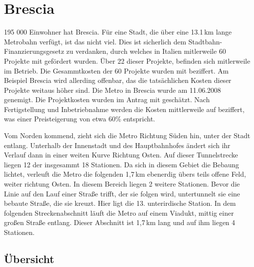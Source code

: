 \section{Brescia} 

195 000 Einwohner hat Brescia. Für eine Stadt, die über eine 13.1\,km lange Metrobahn verfügt, ist das nicht viel. Dies ist sicherlich dem Stadtbahn-Finanzierungsgesetz zu verdanken, durch welches in Italien mitlerweile 60 Projekte mit  gefördert wurden. Über 22 dieser Projekte, befinden sich mitlerweile im Betrieb. Die Gesammtkosten der 60 Projekte wurden mit  beziffert. Am Beispiel Brescia wird allerding offenbar, das die tatsächlichen Kosten dieser Projekte weitaus höher sind. Die Metro in Brescia wurde am 11.06.2008 genemigt. Die Projektkosten wurden im Antrag mit  geschätzt.\cite{brescSv} Nach Fertigstellung und Inbetriebnahme werden die Kosten mittlerweile auf  beziffert, was einer Preisteigerung von etwa 60\% entspricht\cite{brescRai}.  

Vom Norden kommend, zieht sich die Metro Richtung Süden hin, unter der Stadt entlang. Unterhalb der Innenstadt und des Hauptbahnhofes ändert sich ihr Verlauf dann in einer weiten Kurve Richtung Osten. Auf dieser Tunnelstrecke liegen 12 der insgesammt 18 Stationen. Da sich in diesem Gebiet die Bebaung lichtet, verleuft die Metro die folgenden 1,7\,km ebenerdig übers teils offene Feld, weiter richtung Osten. In diesem Bereich liegen 2 weitere Stationen. Bevor die Linie auf den Lauf einer Straße trifft, der sie folgen wird, untertunnelt sie eine bebaute Straße, die sie kreuzt. Hier ligt die 13. unterirdische Station. In dem folgenden Streckenabschnitt läuft die Metro auf einem Viadukt, mittig einer großen Straße entlang. Dieser Abschnitt ist 1,7\,km lang und auf ihm liegen 4 Stationen.\cite{brescSts}


\begin{landscape}
\enlargethispage{2cm}
\begin{minipage}{\textwidth}
\section{Übersicht}

\end{minipage}
\end{landscape}


